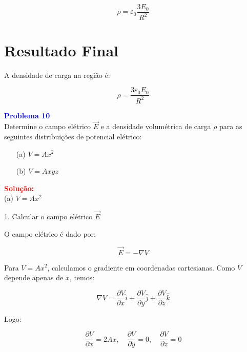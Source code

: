 \documentclass[a4paper,12pt]{article}
\begin{document}
\begin{flushleft}
\begin{equation}
\rho = \varepsilon_0 \frac{3 E_0}{R^2}
\end{equation}

\section*{Resultado Final}

A densidade de carga na região é:

\begin{equation}
\boxed{\rho = \frac{3 \varepsilon_0 E_0}{R^2}}
\end{equation}

\end{flushleft}

\begin{flushleft}
\textbf{\textcolor{blue}{\Large Problema 10}}\\

Determine o campo elétrico \( \vec{E} \) e a densidade volumétrica de carga \( \rho \) para as 
seguintes distribuições de potencial elétrico:

\begin{itemize}
    \item[(a)] \( V = A x^2 \)
    \item[(b)] \( V = A x y z \)
\end{itemize}

\textcolor{red}{\textbf{Solução:}}\\

(a) \( V = A x^2 \)

1. Calcular o campo elétrico \( \vec{E} \)

O campo elétrico é dado por:

\begin{equation}
\vec{E} = -\nabla V
\end{equation}

Para \( V = A x^2 \), calculamos o gradiente em coordenadas cartesianas. Como \(V\) depende apenas de \(x\), temos:

\begin{equation}
\nabla V = \frac{\partial V}{\partial x} \hat{i} + \frac{\partial V}{\partial y} \hat{j} + \frac{\partial V}{\partial z} \hat{k}
\end{equation}

Logo:

\begin{equation}
\frac{\partial V}{\partial x} = 2 A x, \quad \frac{\partial V}{\partial y} = 0, \quad \frac{\partial V}{\partial z} = 0
\end{equation}


\end{flushleft}
\end{document}
